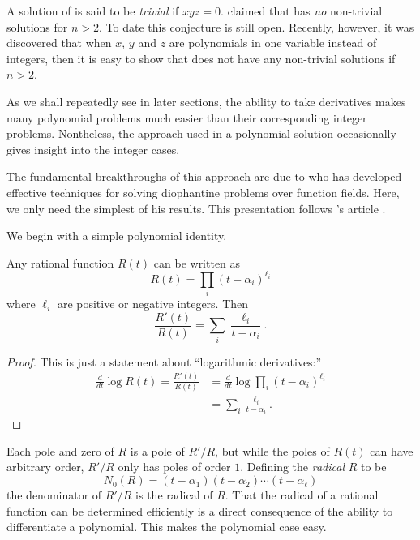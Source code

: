A solution of  is said to be {\em trivial} if $xyz =
0$.  {\Fermat} claimed that  has {\em no} non-trivial
solutions for $n > 2$.  To date this conjecture is still open.
Recently, however, it was discovered that when $x$, $y$ and $z$ are
polynomials in one variable instead of integers, then it is easy to
show that  does not have any non-trivial solutions if
$n > 2$.

As we shall repeatedly see in later sections, the ability to take
derivatives makes many polynomial problems much easier than their
corresponding integer problems.  Nontheless, the approach used in a
polynomial solution occasionally gives insight into the  integer
cases.  

The fundamental breakthroughs of this approach are due to {\Mason}
\cite{Mason:1984} who has developed effective techniques for solving
diophantine problems over function fields.  Here, we only need the
simplest of his results.  This presentation follows {\Lang}'s article
\cite{Lang90}.

We begin with a simple polynomial identity.

\begin{proposition}\label{Ratfun:LogDeriv:Prop}
Any rational function $R(t)$ can be written as 
\[
R(t) = \prod_i(t - \alpha_i)^{\ell_i}
\]
where $\ell_i$ are positive or negative integers.  Then
\[
\frac{R'(t)}{R(t)} = \sum_i \frac{\ell_i}{t - \alpha_i}.
\]
\end{proposition}

\begin{proof}
This is just a statement about ``logarithmic derivatives:''
\[
\begin{aligned}
  \frac{d}{dt} \log R(t) = \frac{R'(t)}{R(t)} 
    & = \frac{d}{dt} \log \prod_i(t - \alpha_i)^{\ell_i} \\
    & = \sum_i \frac{\ell_i}{t - \alpha_i}.
\end{aligned}
\]
\end{proof}


Each pole and zero of $R$ is a pole of $R'/R$, but while the poles of
$R(t)$ can have arbitrary order, $R'/R$ only has poles of order $1$.
Defining the {\em radical} $R$ to be
\[
N_0(R) = (t - \alpha_1)  (t - \alpha_2) \cdots (t - \alpha_{\ell})
\]
the denominator of $R'/R$ is the radical of $R$.  That the radical of
a rational function can be determined efficiently is a direct
consequence of the ability to differentiate a polynomial.  This makes
the polynomial case easy.

